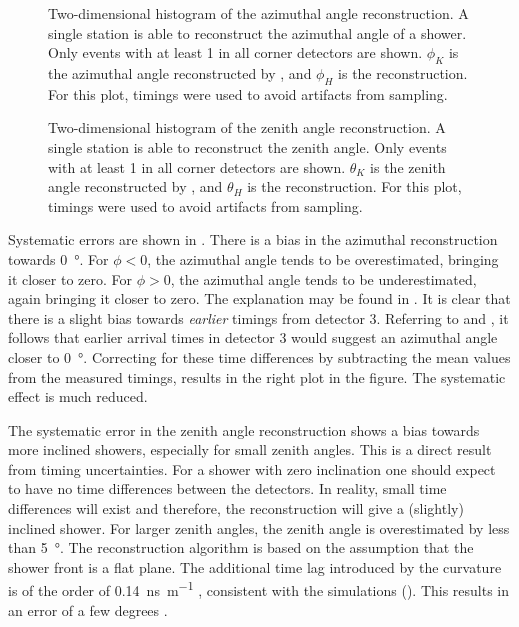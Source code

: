 \begin{figure}
\centering
\longprocess{}
\caption{Two-dimensional histogram of the azimuthal angle reconstruction.
A single \hisparc station is able to reconstruct the azimuthal angle of a
shower.  Only events with at least \SI{1}{\mip} in all corner detectors
are shown.  $\phi_K$ is the azimuthal angle reconstructed by \kascade, and
$\phi_H$ is the \hisparc reconstruction.  For this plot,
 timings were used to avoid artifacts from sampling.}
\label{fig:results-2d-phi}
\end{figure}

\begin{figure}
\centering
\longprocess{}
\caption{Two-dimensional histogram of the zenith angle reconstruction.  A
single \hisparc station is able to reconstruct the zenith angle.  Only
events with at least \SI{1}{\mip} in all corner detectors are shown.
$\theta_K$ is the zenith angle reconstructed by \kascade, and $\theta_H$
is the \hisparc reconstruction.  For this plot,  timings
were used to avoid artifacts from sampling.}
\label{fig:results-2d-theta}
\end{figure}

Systematic errors are shown in
.  There is a bias in the
azimuthal reconstruction towards \SI{0}{\degree}.  For $\phi < 0$, the azimuthal
angle tends to be overestimated, bringing it closer to zero.  For $\phi > 0$,
the azimuthal angle tends to be underestimated, again bringing it closer to
zero.  The explanation may be found in .  It is clear that
there is a slight bias towards \emph{earlier} timings from detector 3.
Referring to  and , it follows
that earlier arrival times in detector 3 would suggest an azimuthal angle
closer to \SI{0}{\degree}.  Correcting for these time differences by subtracting
the mean values from the measured timings, results in the right plot in the
figure.
The systematic effect is much reduced.

The systematic error in the zenith angle reconstruction shows a bias towards
more inclined showers, especially for small zenith angles.  This is a direct
result from timing uncertainties.  For a shower with zero inclination one should
expect to have no time differences between the detectors.  In reality, small
time differences will exist and therefore, the reconstruction will give a
(slightly) inclined shower.  For larger zenith angles, the zenith angle is
overestimated by less than \SI{5}{\degree}.  The reconstruction algorithm is
based on the assumption that the shower front is a flat plane. The additional
time lag introduced by the curvature is of the order of
\SI{.14}{\nano\second\per\meter} \cite{1991ICRC....2..712M}, consistent with the
simulations ().  This results in an error
of a few degrees \cite{1991ICRC....2..712M}.


